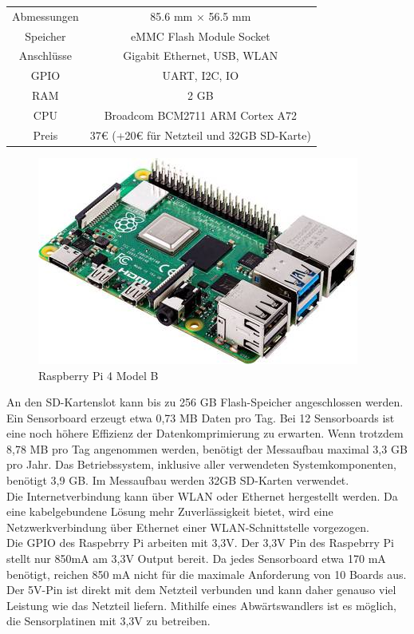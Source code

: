 \begin{center}
\begin{tabular}{ c c }
 Abmessungen & 85.6 mm × 56.5 mm \\ 
 Speicher & eMMC Flash Module Socket \\  
 Anschlüsse & Gigabit Ethernet, USB, WLAN \\  
 GPIO & UART, I2C, IO \\  
 RAM & 2 GB \\  
 CPU & Broadcom BCM2711 ARM Cortex A72 \\  
 Preis & 37€ (+20€ für Netzteil und 32GB SD-Karte)  
\end{tabular}
\end{center}
\begin{figure}[H]
  \centering
 \includegraphics[width=0.5\linewidth]{img/Raspberry-Pi-4-Model-B}
	\caption{Raspberry Pi 4 Model B \cite{raspberrypi_fundation}}
  \label{fig:Raspberry_Pi_4_Model_B}
\end{figure}
An den SD-Kartenslot kann bis zu 256 GB Flash-Speicher angeschlossen werden.
Ein Sensorboard erzeugt etwa 0,73 MB Daten pro Tag.
Bei 12 Sensorboards ist eine noch höhere Effizienz der Datenkomprimierung zu erwarten. Wenn trotzdem 8,78 MB pro Tag angenommen werden, benötigt der Messaufbau maximal 3,3 GB pro Jahr.
Das Betriebssystem, inklusive aller verwendeten Systemkomponenten, benötigt 3,9 GB.
Im Messaufbau werden 32GB SD-Karten verwendet.\\
Die Internetverbindung kann über WLAN oder Ethernet hergestellt werden.
Da eine kabelgebundene Lösung mehr Zuverlässigkeit bietet, wird eine Netzwerkverbindung über Ethernet einer WLAN-Schnittstelle vorgezogen.\\
Die GPIO des Raspebrry Pi arbeiten mit 3,3V.
Der 3,3V Pin des Raspebrry Pi stellt nur 850mA am 3,3V Output bereit.
Da jedes Sensorboard etwa 170 mA benötigt, reichen 850 mA nicht für die maximale Anforderung von 10 Boards aus.
Der 5V-Pin ist direkt mit dem Netzteil verbunden und kann daher genauso viel Leistung wie das Netzteil liefern. Mithilfe eines Abwärtswandlers ist es möglich, die Sensorplatinen mit 3,3V zu betreiben.\\

